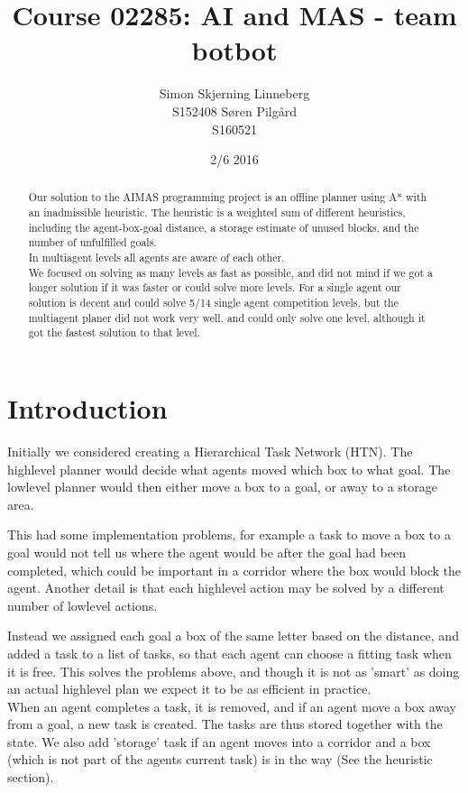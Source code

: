 \documentclass[letterpaper]{article}
\title{Course 02285: AI and MAS - team botbot}
\author{Simon Skjerning Linneberg\\ S152408 \And Søren Pilgård\\ S160521}
\date{2/6 2016}
\begin{document}
\maketitle

\begin{abstract}
Our solution to the AIMAS programming project is an offline planner using A*
with an inadmissible heuristic. The heuristic is a weighted sum of different heuristics,
including the agent-box-goal distance, a storage estimate of unused blocks, and
the number of unfulfilled goals.\\

In multiagent levels all agents are aware of each other.\\

We focused on solving as many levels as fast as possible, and did not mind if we
got a longer solution if it was faster or could solve more levels. For a single
agent our solution is decent and could solve 5/14 single agent competition levels,
but the multiagent planer did not work very well, and could only solve one level,
although it got the fastest solution to that level.
\end{abstract}

\section{Introduction}
Initially we considered creating a Hierarchical Task Network (HTN). The highlevel
planner would decide what agents moved which box to what goal. The lowlevel planner
would then either move a box to a goal, or away to a storage area.

This had some implementation problems, for example a task to move a box to a goal
would not tell us where the agent would be after the goal had been completed, which
could be important in a corridor where the box would block the agent. Another detail
is that each  highlevel action may be solved by a different number of lowlevel actions.

Instead we assigned each goal a box of the same letter based on the distance, and
added a task to a list of tasks, so that each agent can choose a fitting task
when it is free. This solves the problems above, and though it is not as 'smart'
as doing an actual highlevel plan we expect it to be as efficient in practice.\\

When an agent completes a task, it is removed, and if an agent move a box away from
a goal, a new task is created. The tasks are thus stored together with the state.
We also add 'storage' task if an agent moves into a corridor and a box (which is not
part of the agents current task) is in the way (See the heuristic section).
\end{document}
